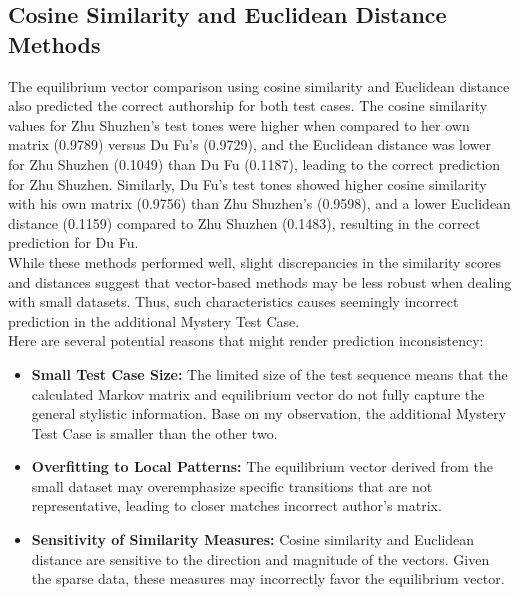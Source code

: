 \documentclass[12pt]{article}
\begin{document}
\subsection*{Cosine Similarity and Euclidean Distance Methods}
The equilibrium vector comparison using cosine similarity and Euclidean distance also predicted the correct authorship for both test cases. 
The cosine similarity values for Zhu Shuzhen's test tones were higher when compared to her own matrix (0.9789) versus Du Fu’s (0.9729), and the Euclidean distance was lower for Zhu Shuzhen (0.1049) than Du Fu (0.1187), leading to the correct prediction for Zhu Shuzhen. 
Similarly, Du Fu's test tones showed higher cosine similarity with his own matrix (0.9756) than Zhu Shuzhen's (0.9598), and a lower Euclidean distance (0.1159) compared to Zhu Shuzhen (0.1483), resulting in the correct prediction for Du Fu.
\\
While these methods performed well, slight discrepancies in the similarity scores and distances suggest that vector-based methods may be less robust when dealing with small datasets.
Thus, such characteristics causes seemingly incorrect prediction in the additional Mystery Test Case.
\\
\noindent Here are several potential reasons that might render prediction inconsistency:
\begin{itemize}
    \item \textbf{Small Test Case Size:} The limited size of the test sequence means that the calculated Markov matrix and equilibrium vector do not fully capture the general stylistic information. Base on my observation, the additional Mystery Test Case is smaller than the other two.
    \item \textbf{Overfitting to Local Patterns:} The equilibrium vector derived from the small dataset may overemphasize specific transitions that are not representative, leading to closer matches incorrect author's matrix.
    \item \textbf{Sensitivity of Similarity Measures:} Cosine similarity and Euclidean distance are sensitive to the direction and magnitude of the vectors. Given the sparse data, these measures may incorrectly favor the equilibrium vector.
\end{itemize}
\end{document}
